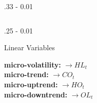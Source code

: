 \documentclass{postertheme}\usepackage[]{graphicx}\usepackage[]{color}
\begin{document}
\begin{frame}
\begin{columns}[onlytextwidth]
  \begin{column}{.33 \textwidth - 0.01 \textwidth}
  \end{column}

\end{columns}


\begin{columns}[onlytextwidth]
  
  \begin{column}{.25 \textwidth - 0.01 \textwidth}
    \begin{block}{Linear Variables}
      
      \textbf{micro-volatility:}  $ \rightarrow HL_{t}$ \\
      \textbf{micro-trend:} $ \rightarrow CO_{t}$ \\
      \textbf{micro-uptrend:} $ \rightarrow HO_{t}$ \\ 
      \textbf{micro-downtrend:} $ \rightarrow OL_{t}$
      

\end{block}
\end{column}
\end{columns}
\end{frame}
\end{document}
